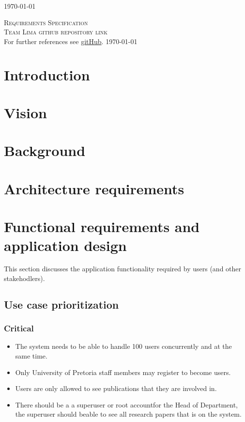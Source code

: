\documentclass[a4paper,12pt]{report}
\begin{document}
\begin{titlepage}
\begin{center}
{\large \today}
\end{center}
\end{titlepage}
\footnotesize
\normalsize

\renewcommand{\thesection}{\arabic{section}}
\newpage
\begin{center}
\textsc{\LARGE Requirements Specification}\\[1.5cm]
\textsc{\Large Team Lima github repository link}\\[0.5cm]
For further references see \href{https://https://github.com/slugger7/team-lima}{gitHub}.
\today
\end{center}


\newpage
\section{Introduction}

\newpage
\section{Vision}

\newpage
\section{Background}

\newpage
\section{Architecture requirements}

\newpage
\section{Functional requirements and application design}
This section discusses the application functionality required by users (and other stakehodlers).

\subsection{Use case prioritization}
\subsubsection{Critical}
	\begin{itemize}
		\item The system needs to be able to handle 100 users concurrently and at the same time.
		\item Only University of Pretoria staff members may register to become users.
		\item Users are only allowed to see publications that they are involved in.
		\item There should be a a superuser or root accountfor the Head of Department, the superuser should beable to see all research papers that is on the system.
	\end{itemize}
\end{document}
